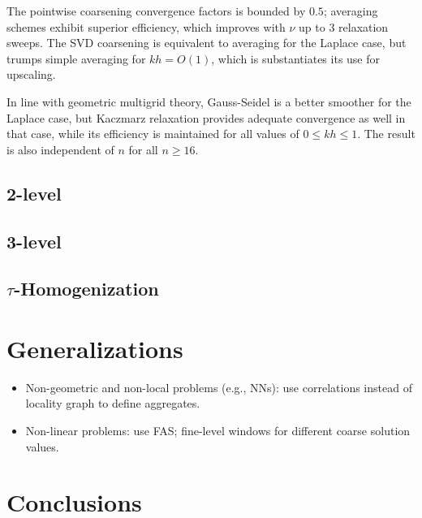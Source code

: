 \documentclass{article}
\begin{document}
The pointwise coarsening convergence factors is bounded by $0.5$; averaging schemes exhibit superior efficiency, which improves with $\nu$ up to $3$ relaxation sweeps. The SVD coarsening is equivalent to averaging for the Laplace case, but trumps simple averaging for $kh = O(1)$, which is substantiates its use for upscaling.

In line with geometric multigrid theory, Gauss-Seidel is a better smoother for the Laplace case, but Kaczmarz relaxation provides adequate convergence as well in that case, while its efficiency is maintained for all values of $0 \leq kh \leq 1$. The result is also independent of $n$ for all $n \geq 16$.

\subsection{2-level}

\subsection{3-level}

\subsection{$\tau$-Homogenization}

\section{Generalizations}
\begin{itemize}
	\item Non-geometric and non-local problems (e.g., NNs): use correlations instead of locality graph to define aggregates.
	\item Non-linear problems: use FAS; fine-level windows for different coarse solution values.
\end{itemize}

\section{Conclusions}
\end{document}
